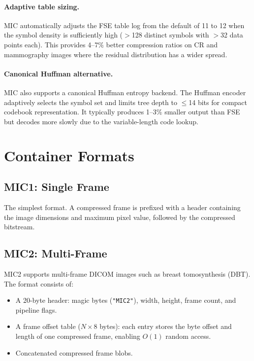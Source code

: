 \documentclass[11pt,twocolumn]{article}
\begin{document}
\paragraph{Adaptive table sizing.}
MIC automatically adjusts the FSE table log from the default of 11 to 12 when the symbol density is sufficiently high ($>$128 distinct symbols with $>$32 data points each).
This provides 4--7\% better compression ratios on CR and mammography images where the residual distribution has a wider spread.

\paragraph{Canonical Huffman alternative.}
MIC also supports a canonical Huffman entropy backend.
The Huffman encoder adaptively selects the symbol set and limits tree depth to $\leq$14 bits for compact codebook representation.
It typically produces 1--3\% smaller output than FSE but decodes more slowly due to the variable-length code lookup.

\section{Container Formats}
\label{sec:formats}

\subsection{MIC1: Single Frame}

The simplest format.
A compressed frame is prefixed with a header containing the image dimensions and maximum pixel value, followed by the compressed bitstream.

\subsection{MIC2: Multi-Frame}

MIC2 supports multi-frame DICOM images such as breast tomosynthesis (DBT).
The format consists of:
\begin{itemize}[nosep]
    \item A 20-byte header: magic bytes (\texttt{"MIC2"}), width, height, frame count, and pipeline flags.
    \item A frame offset table ($N \times 8$ bytes): each entry stores the byte offset and length of one compressed frame, enabling $O(1)$ random access.
    \item Concatenated compressed frame blobs.
\end{itemize}
\end{document}
